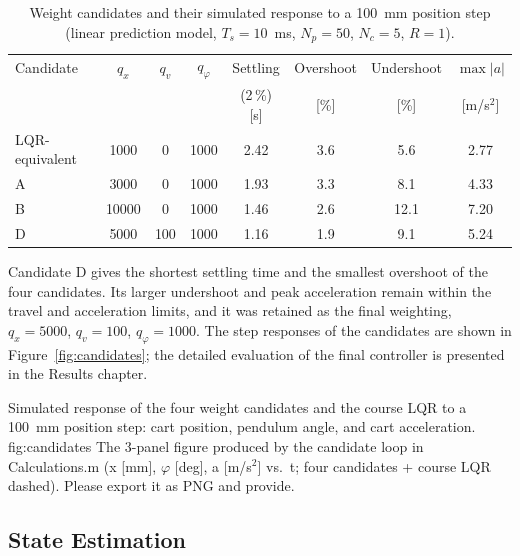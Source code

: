 \begin{table}[ht]
\centering
\caption{Weight candidates and their simulated response to a 100~mm position step (linear prediction model, $T_s = 10$~ms, $N_p = 50$, $N_c = 5$, $R = 1$).}
\label{tab:candidates}
\small
\setlength{\tabcolsep}{4pt}
\begin{tabular}{lccccccc}
\toprule
Candidate & $q_x$ & $q_v$ & $q_\varphi$ & Settling & Overshoot & Undershoot & $\max|a|$ \\
          &       &       &             & (2\,\%) [s] & [\%] & [\%] & [m/s$^2$] \\
\midrule
LQR-equivalent & 1000 & 0 & 1000 & 2.42 & 3.6 & 5.6 & 2.77 \\
A & 3000 & 0 & 1000 & 1.93 & 3.3 & 8.1 & 4.33 \\
B & 10000 & 0 & 1000 & 1.46 & 2.6 & 12.1 & 7.20 \\
D & 5000 & 100 & 1000 & 1.16 & 1.9 & 9.1 & 5.24 \\
\bottomrule
\end{tabular}
\end{table}

Candidate D gives the shortest settling time and the smallest overshoot of the
four candidates. Its larger undershoot and peak acceleration remain within the
travel and acceleration limits, and it was retained as the final weighting,
$q_x = 5000$, $q_v = 100$, $q_\varphi = 1000$. The step responses of the
candidates are shown in Figure~\ref{fig:candidates}; the detailed evaluation of
the final controller is presented in the Results chapter.

  {Simulated response of the four weight candidates and the course \acs{LQR} to a 100~mm position step: cart position, pendulum angle, and cart acceleration.}
  {fig:candidates}
  {The 3-panel figure produced by the candidate loop in Calculations.m (x [mm], $\varphi$ [deg], a [m/s$^2$] vs.\ t; four candidates + course LQR dashed). Please export it as PNG and provide.}

\subsection{State Estimation}
\label{subsec:estimation}

